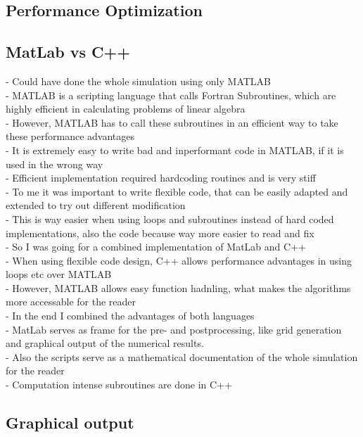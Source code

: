 \documentclass[parskip=half, titlepage=yes, 12pt, BCOR=12mm, DIV=calc]{scrartcl}
\begin{document}
\subsection{Performance Optimization}
\subsection{MatLab vs C++}
- Could have done the whole simulation using only MATLAB \\
- MATLAB is a scripting language that calls Fortran Subroutines, which are highly efficient in calculating problems of linear algebra \\
- However, MATLAB has to call these subroutines in an efficient way to take these performance advantages \\
- It is extremely easy to write bad and inperformant code in MATLAB, if it is used in the wrong way \\
- Efficient implementation required hardcoding routines and is very stiff \\ 
- To me it was important to write flexible code, that can be easily adapted and extended to try out different modification \\
- This is way easier when using loops and subroutines instead of hard coded implementations, also the code because way more easier to read and fix \\
- So I was going for a combined implementation of MatLab and C++ \\ 
- When using flexible code design, C++ allows performance advantages in using loops etc over MATLAB \\
- However, MATLAB allows easy function hadnling, what makes the algorithms more accessable for the reader \\ 
- In the end I combined the advantages of both languages \\
- MatLab serves as frame for the pre- and postprocessing, like grid generation and graphical output of the numerical results. \\
- Also the scripts serve as a mathematical documentation of the whole simulation for the reader \\
- Computation intense subroutines are done in C++ \\


\subsection{Graphical output}
\end{document}
